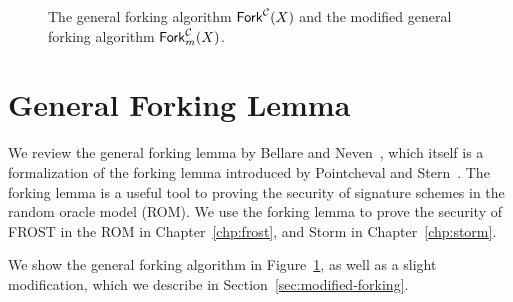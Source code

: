 

\begin{figure}[t]
\begin{pcvstack}[boxed,center,space=1em]
    \centering
\end{pcvstack}
    \caption{
    The general forking algorithm $\mathsf{Fork}^{\mathcal{C}}(X)$ and the modified general forking algorithm $\mathsf{Fork}_m^{\mathcal{C}}(X)$.
    }
    \label{fg:gen-fork-mod}
\end{figure}




\section{General Forking Lemma}
\label{mod-fork}



We review the general forking lemma by Bellare and Neven~\cite{BellareN06},
which itself is a formalization of the forking lemma  introduced by Pointcheval and Stern~\cite{PointchevalS96}.
The forking lemma is a useful tool to proving the security of signature schemes in the random oracle model (ROM).
We use the forking lemma to prove the security of FROST in the ROM in Chapter~\ref{chp:frost},
and Storm in Chapter~\ref{chp:storm}.

We show the general forking algorithm in Figure~\ref{fg:gen-fork-mod},
as well as a slight modification,
which we describe in Section~\ref{sec:modified-forking}.

